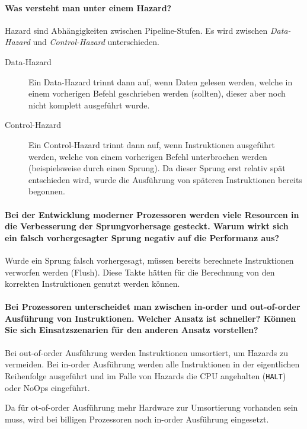             \paragraph{Was versteht man unter einem Hazard?}
                Hazard sind Abhängigkeiten zwischen Pipeline-Stufen. Es wird zwischen \textit{Data-Hazard} und \textit{Control-Hazard} unterschieden.
                \begin{description}
                    \item[Data-Hazard] Ein Data-Hazard trinnt dann auf, wenn Daten gelesen werden, welche in einem vorherigen Befehl geschrieben werden (sollten), dieser aber noch nicht komplett ausgeführt wurde.
                    \item[Control-Hazard] Ein Control-Hazard trinnt dann auf, wenn Instruktionen ausgeführt werden, welche von einem vorherigen Befehl unterbrochen werden (beispielsweise durch einen Sprung). Da dieser Sprung erst relativ spät entschieden wird, wurde die Ausführung von späteren Instruktionen bereits begonnen.
                \end{description}

            \paragraph{Bei der Entwicklung moderner Prozessoren werden viele Resourcen in die Verbesserung der Sprungvorhersage gesteckt. Warum wirkt sich ein falsch vorhergesagter Sprung negativ auf die Performanz aus?}
                Wurde ein Sprung falsch vorhergesagt, müssen bereits berechnete Instruktionen verworfen werden (Flush). Diese Takte hätten für die Berechnung von den korrekten Instruktionen genutzt werden können.

            \paragraph{Bei Prozessoren unterscheidet man zwischen in-order und out-of-order Ausführung von Instruktionen. Welcher Ansatz ist schneller? Können Sie sich Einsatzszenarien für den anderen Ansatz vorstellen?}
                Bei out-of-order Ausführung werden Instruktionen umsortiert, um Hazards zu vermeiden. Bei in-order Ausführung werden alle Instruktionen in der eigentlichen Reihenfolge ausgeführt und im Falle von Hazards die CPU angehalten (\texttt{HALT}) oder NoOps eingeführt.

                Da für ot-of-order Ausführung mehr Hardware zur Umsortierung vorhanden sein muss, wird bei billigen Prozessoren noch in-order Ausführung eingesetzt.
